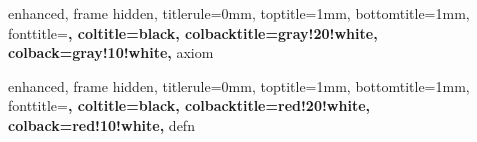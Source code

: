 %





{
    enhanced,
    frame hidden,
    titlerule=0mm,
    toptitle=1mm,
    bottomtitle=1mm,
    fonttitle=\bfseries\large,
    coltitle=black,
    colbacktitle=gray!20!white,
    colback=gray!10!white,
}{axiom}



{
    enhanced,
    frame hidden,
    titlerule=0mm,
    toptitle=1mm,
    bottomtitle=1mm,
    fonttitle=\bfseries\large,
    coltitle=black,
    colbacktitle=red!20!white,
    colback=red!10!white,
}{defn}



